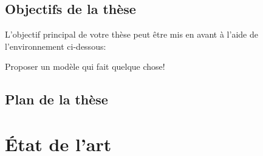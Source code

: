 \documentclass[french]{spimutbmphdthesis}
\begin{document}
\section{Objectifs de la thèse}

L'objectif principal de votre thèse peut être mis en avant à l'aide de l'environnement ci-dessous:

\begin{emphbox}
	Proposer un modèle qui fait quelque chose!
\end{emphbox}

\section{Plan de la thèse}

\chapter{\'Etat de l'art}
\end{document}
